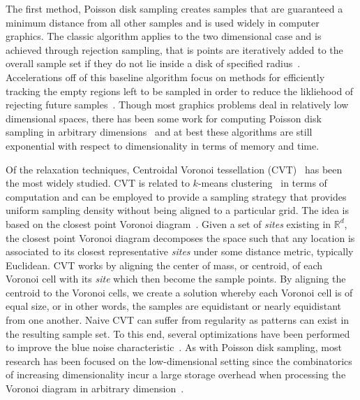 The first method, Poisson disk sampling creates samples that are guaranteed a minimum distance from all other samples and is used widely in computer graphics.
%
The classic algorithm applies to the two dimensional case and is achieved through rejection sampling, that is points are iteratively added to the overall sample set if they do not lie inside a disk of specified radius~\cite{Cook1986}.
%
Accelerations off of this baseline algorithm focus on methods for efficiently tracking the empty regions left to be sampled in order to reduce the likliehood of rejecting future samples~\cite{EbeidaDavidsonPatney2011,EbeidaMitchellPatney2012,GamitoMaddock2009,Jones2006,JonesKarger2011,WhiteClineEgbert2007}.
%
Though most graphics problems deal in relatively low dimensional spaces, there has been some work for computing Poisson disk sampling in arbitrary dimensions~\cite{Bridson2007,EbeidaMitchellPatney2012,EbeidaMitchellPatney2015,GamitoMaddock2009} and at best these algorithms are still exponential with respect to dimensionality in terms of memory and time.

Of the relaxation techniques, Centroidal Voronoi tessellation (CVT)~\cite{DuFaberGunzburger1999} has been the most widely studied.
%
CVT is related to $k$-means clustering~\cite{HastieTibshiraniFriedman2008} in terms of computation and can be employed to provide a sampling strategy that provides uniform sampling density without being aligned to a particular grid.
%
The idea is based on the closest point Voronoi diagram~\cite{deBergCheongKreveld2008}.
%
Given a set of \emph{sites} existing in $\mathbb{R}^d$, the closest point Voronoi diagram decomposes the space such that any location is associated to its closest representative \emph{sites} under some distance metric, typically Euclidean.
%
CVT works by aligning the center of mass, or centroid, of each Voronoi cell with its \emph{site} which then become the sample points.
%
By aligning the centroid to the Voronoi cells, we create a solution whereby each Voronoi cell is of equal size, or in other words, the samples are equidistant or nearly equidistant from one another.
%
Naive CVT can suffer from regularity as patterns can exist in the resulting sample set.
%
To this end, several optimizations have been performed to improve the blue noise characteristic~\cite{BalzerScholmerDeussen2009, ChenYuanChoi2012,deGoesBreedenOstromoukhov2012, XuLiuGotsman2011}.
%
As with Poisson disk sampling, most research has been focused on the low-dimensional setting since the combinatorics of increasing dimensionality incur a large storage overhead when processing the Voronoi diagram in arbitrary dimension~\cite{BoissonnatChazalYvinec2017}.

